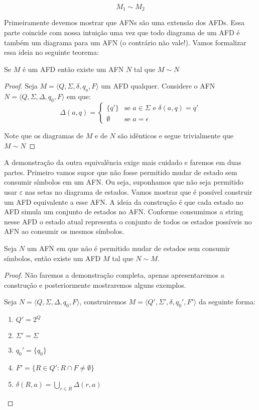   \begin{displaymath}
    M_1 \sim M_2
  \end{displaymath}
\medskip

Primeiramente devemos mostrar que AFNs são uma extensão dos AFDs.
Essa parte coincide com nossa intuição uma vez que todo diagrama de um AFD é também um diagrama para um AFN (o contrário não vale!).
Vamos formalizar essa ideia no seguinte teorema:


\begin{theorem}
  Se $M$ é um AFD então existe um AFN $N$ tal que $M \sim N$
\end{theorem}
\begin{proof}
  Seja $M = \langle Q, \Sigma, \delta, q_o, F \rangle$ um AFD qualquer.
  Considere o AFN $N = \langle Q, \Sigma, \Delta, q_0, F \rangle$ em que:
\begin{displaymath}
 \Delta(a, q) = \left\{
 \begin{array}{cl}
   \{q'\} & \textrm{se $a \in \Sigma$ e }  \delta(a,q) = q'\\
   \emptyset & \textrm{se } a = \epsilon
 \end{array} \right.
\end{displaymath}

Note que os diagramas de $M$ e de $N$ são idênticos e segue trivialmente que $M \sim N$
\end{proof}

A demonstração da outra equivalência exige mais cuidado e faremos em duas partes.
Primeiro vamos supor que não fosse permitido mudar de estado sem consumir símbolos em um AFN.
Ou seja, suponhamos que não seja permitido usar $\varepsilon$ nas setas no diagrama de estados.
Vamos mostrar que é possível construir um AFD equivalente a esse AFN.
A ideia da construção é que cada estado no AFD simula um conjunto de estados no AFN.
Conforme consumimos a string nesse AFD o estado atual representa o conjunto de todos os estados possíveis no AFN ao consumir os mesmos símbolos.


\begin{lemma}
  Seja $N$ um AFN em que não é permitido mudar de estados sem consumir símbolos, então existe um AFD $M$ tal que $N \sim M$.
\end{lemma}
\begin{proof}
  Não faremos a demonstração completa, apenas apresentaremos a construção e posteriormente mostraremos alguns exemplos.

  Seja $N = \langle Q, \Sigma, \Delta, q_0, F \rangle$, construiremos $M = \langle Q', \Sigma', \delta, q_0', F' \rangle$ da seguinte forma:

  \begin{enumerate}
  \item $Q' = 2^Q$
  \item $\Sigma' = \Sigma$
  \item $q_0' = \{q_0 \}$
  \item $F' = \{R \in Q' : R \cap F \neq \emptyset\}$
  \item $\delta(R, a) = \bigcup_{r \in R} \Delta(r,a)$
  \end{enumerate}
\end{proof}

